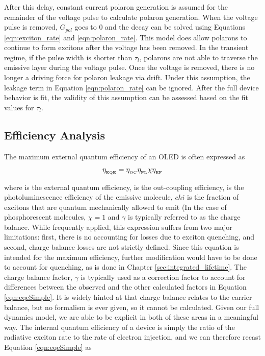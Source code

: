 \documentclass[../thesis.tex]{subfiles}
\begin{document}
After this delay, constant current polaron generation is assumed for the remainder of the voltage pulse to calculate polaron generation.  
When the voltage pulse is removed, $G_{pol}$ goes to 0 and the decay can be solved using Equations \ref{eqn:exciton_rate} and \ref{eqn:polaron_rate}.
This model does allow polarons to continue to form excitons after the voltage has been removed.
In the transient regime, if the pulse width is shorter than $\tau_l$, polarons are not able to traverse the emissive layer during the voltage pulse.  
Once the voltage is removed, there is no longer a driving force for polaron leakage via drift.
Under this assumption, the leakage term in Equation \ref{eqn:polaron_rate} can be ignored.
After the full device behavior is fit, the validity of this assumption can be assessed based on the fit values for $\tau_l$.



\subsection{Efficiency Analysis}

The maximum external quantum efficiency of an OLED is often expressed as\cite{Baldo1998a,Rothberg1996}

\begin{equation}
\eta_{_\text{\tiny EQE}}=\eta_{_\text{\tiny OC}} \eta_{_\text{\tiny PL}} \chi \eta_{_\text{\tiny EF}}
\label{eqn:eqeSimple}
\end{equation}

where \eqe is the external quantum efficiency, \oc is the out-coupling efficiency, \pl is the photoluminescence efficiency of the emissive molecule, $chi$ is the fraction of excitons that are quantum mechanically allowed to emit (In the case of phosphorescent molecules, $\chi=1$ and $\gamma$ is  typically referred to as the charge balance.
While frequently applied, this expression suffers from two major limitations: first, there is no accounting for losses due to exciton quenching, and second, charge balance losses are not strictly defined.  
Since this equation is intended for the maximum efficiency, further modification would have to be done to account for quenching, as is done in Chapter \ref{sec:integrated_lifetime}.
The charge balance factor, $\gamma$ is typically used as a correction factor to account for differences between the observed \eqe and the other calculated factors in Equation \ref{eqn:eqeSimple}.
It is widely hinted at that charge balance relates to the carrier balance, but no formalism is ever given, so it cannot be calculated.
Given our full dynamics model, we are able to be explicit in both of these areas in a meaningful way.  
The internal quantum efficiency of a device is simply the ratio of the radiative exciton rate to the rate of electron injection, and we can therefore recast Equation \ref{eqn:eqeSimple} as
\end{document}
